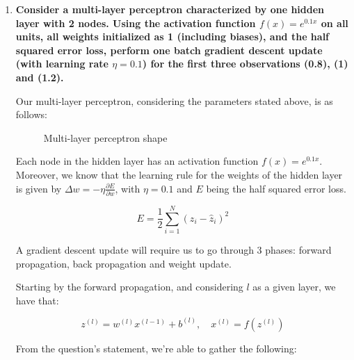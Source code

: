 \documentclass[12pt]{article}
\begin{document}
\begin{enumerate}[leftmargin=\labelsep]
        \pagebreak

  \item \textbf{Consider a multi-layer perceptron characterized by one hidden layer with 2 nodes.
          Using the activation function $f(x) = e^{0.1x}$ on all units, all weights
          initialized as 1 (including biases), and the half squared error loss, perform
          one batch gradient descent update (with learning rate $\eta = 0.1$)
          for the first three observations (0.8), (1) and (1.2).
        }

        Our multi-layer perceptron, considering the parameters stated above, is as follows:

        \begin{figure}[H]
          \centering
          
          \caption{Multi-layer perceptron shape}
        \end{figure}

        Each node in the hidden layer has an activation function $f(x) = e^{0.1x}$.
        Moreover, we know that the learning rule for the weights of the hidden layer
        is given by $\Delta w = - \eta \frac{\partial E}{\partial w}$, with $\eta = 0.1$
        and $E$ being the half squared error loss.

        \begin{equation*}
          E = \frac{1}{2} \sum_{i=1}^N (z_i - \hat{z}_i)^2
        \end{equation*}

        A gradient descent update will require us to go through 3 phases: forward
        propagation, back propagation and weight update.

        Starting by the forward propagation, and considering $l$ as a given layer,
        we have that:

        \begin{equation*}
          z^{(l)} = w^{(l)} x^{(l - 1)} + b^{(l)}, \quad x^{(l)} = f(z^{(l)})
        \end{equation*}

        From the question's statement, we're able to gather the following:


\end{enumerate}
\end{document}
